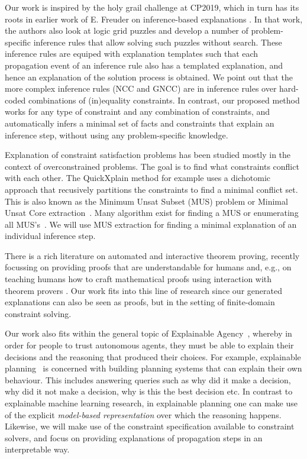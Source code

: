 Our work is inspired by the holy grail challenge at CP2019, which in turn has its roots in earlier work of E. Freuder on inference-based explanations \cite{sqalli1996inference}. In that work, the authors also look at logic grid puzzles and develop a number of problem-specific inference rules that allow solving such puzzles without search. These inference rules are equiped with explanation templates such that each propagation event of an inference rule also has a templated explanation, and hence an explanation of the solution process is obtained. We point out that the more complex inference rules (NCC and GNCC) are in inference rules over hard-coded combinations of (in)equality constraints. In contrast, our proposed method works for any type of constraint and any combination of constraints, and automatically infers a minimal set of facts and constraints that explain an inference step, without using any problem-specific knowledge.

Explanation of constraint satisfaction problems has been studied mostly in the context of overconstrained problems. The goal is to find what constraints conflict with each other. The QuickXplain method \cite{junker2001quickxplain} for example uses a dichotomic approach that recusively partitions the constraints to find a minimal conflict set. This is also known as the Minimum Unsat Subset (MUS) problem or Minimal Unsat Core extraction~\cite{marques2010minimal}. Many algorithm exist for finding a MUS or enumerating all MUS's~\cite{marques2010minimal}. We will use MUS extraction for finding a minimal explanation of an individual inference step.

There is a rich literature on automated and interactive theorem proving, recently focussing on providing proofs that are understandable for humans \cite{Ganesalingam2017} and, e.g.,  on teaching humans how to craft mathematical proofs using interaction with theorem provers \cite{DBLP:conf/icml/YangD19}. 
Our work fits into this line of research since our generated explanations can also be seen as proofs, but in the setting of finite-domain constraint solving.

Our work also fits within the general topic of Explainable Agency~\cite{langley2017explainable}, whereby in order for people to trust autonomous agents, they must be able to explain their decisions and the reasoning that produced their choices. For example, explainable planning~\cite{fox2017explainable} is concerned with building planning systems that can explain their own behaviour. This includes answering queries such as why did it make a decision, why did it not make a decision, why is this the best decision etc. In contrast to explainable machine learning research, in explainable planning one can make use of the explicit \textit{model-based representation} over which the reasoning happens. Likewise, we will make use of the constraint specification available to constraint solvers, and focus on providing explanations of propagation steps in an interpretable way.


